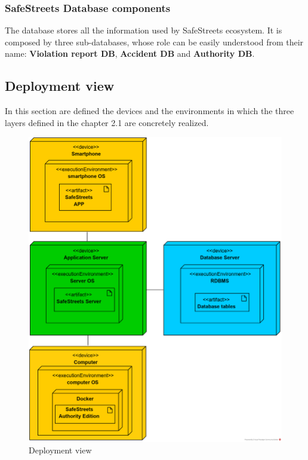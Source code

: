 \documentclass{article}
\begin{document}
		\subsubsection{SafeStreets Database components}
		The database stores all the information used by SafeStreets ecosystem. It is composed by three sub-databases, whose role can be easily understood from their name: \textbf{Violation report DB}, \textbf{Accident DB} and \textbf{Authority DB}.
		
		\clearpage
		\subsection{Deployment view}
		In this section are defined the devices and the environments in which the three layers defined in the chapter 2.1 are concretely realized.
		
		\begin{figure}[H]
			\centering
			\includegraphics [width=\textwidth] {diagrams/deployment_view.png}
			\caption[Deployment View]{Deployment view}
			\label{fig:deployment_view}
		\end{figure}
	
\end{document}
